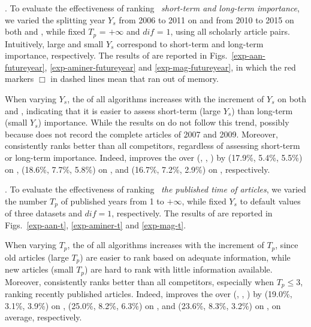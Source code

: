 .
To evaluate the effectiveness of ranking \wrt\ {\em short-term and long-term importance},
we varied the splitting year $Y_s$ from 2006 to 2011 on \aan and from 2010 to 2015 on both \aminer and \magdata, while fixed $T_p$ = $+\infty$ and $dif$ = $1$, \ie using all scholarly article pairs.
%
Intuitively, large and small $Y_s$ correspond to short-term and long-term importance, respectively.
The results of \PairAcc are reported in Figs.~\ref{exp-aan-futureyear}, \ref{exp-aminer-futureyear} and \ref{exp-mag-futureyear}, in which the red markers $\Box$ in dashed lines mean that \hhgrank ran out of memory.


When varying $Y_s$, the \PairAcc of all algorithms increases with the increment of $Y_s$ on both \aminer and \magdata, indicating that it is easier to assess short-term (large $Y_s$) than long-term (small $Y_s$) importance. While the results on \aan do not follow this trend, possibly because \aan does not record the complete articles of 2007 and 2009.
Moreover, \ensemblerank consistently ranks better than all competitors, regardless of assessing short-term or long-term importance.
Indeed, \ensemblerank improves the \PairAcc over (\pagerank, \futurerank, \hhgrank) by (17.9\%, 5.4\%, 5.5\%) on \aan, (18.6\%, 7.7\%, 5.8\%) on \aminer, and  (16.7\%, 7.2\%, 2.9\%) on \magdata, respectively.



.
To evaluate the effectiveness of ranking \wrt\ {\em the published time of articles},
we varied the number $T_p$ of published years from 1 to $+\infty$, while fixed $Y_s$ to default values of three datasets and $dif=1$, respectively. The results of \PairAcc are reported in Figs.~\ref{exp-aan-t}, \ref{exp-aminer-t} and \ref{exp-mag-t}.


When varying $T_p$, the \PairAcc of all algorithms increases with the increment of $T_p$, since old articles (large $T_p$) are easier to rank based on adequate information, while new articles (small $T_p$) are hard to rank with little information available. Moreover, \ensemblerank consistently ranks better than all competitors, especially when $T_p\le3$, \ie ranking recently published articles. Indeed, \ensemblerank improves the \PairAcc over (\pagerank, \futurerank, \hhgrank) by (19.0\%, 3.1\%, 3.9\%) on \aan, (25.0\%, 8.2\%, 6.3\%) on \aminer, and (23.6\%, 8.3\%, 3.2\%) on \magdata, on average, respectively.


